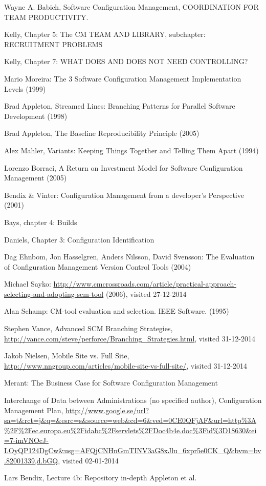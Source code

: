 \documentclass[10pt]{article}
\begin{document}
\begin{thebibliography}{1}

 Wayne A. Babich, Software Configuration Management, COORDINATION FOR TEAM PRODUCTIVITY.

 Kelly, Chapter 5: The CM TEAM AND LIBRARY, subchapter: RECRUITMENT PROBLEMS 

 Kelly, Chapter 7: WHAT DOES AND DOES NOT NEED CONTROLLING? 

 Mario Moreira: The 3 Software Configuration Management Implementation Levels (1999)

 Brad Appleton, Streamed Lines: Branching Patterns for Parallel Software Development (1998)

 Brad Appleton, The Baseline Reproducibility Principle (2005)

 Alex Mahler, Variants: Keeping Things Together and Telling Them Apart (1994)

 Lorenzo Borraci, A Return on Investment Model for Software Configuration Management (2005)

 Bendix \& Vinter: Configuration Management from a developer's Perspective (2001)

 Bays, chapter 4: Builds

 Daniels, Chapter 3: Configuration Identification

 Dag Ehnbom, Jon Hasselgren, Anders Nilsson, David Svensson: The Evaluation of Configuration Management Version Control Tools (2004)

 Michael Sayko: \url{http://www.cmcrossroads.com/article/practical-approach-selecting-and-adopting-scm-tool} (2006), visited 27-12-2014

 Alan Schamp: CM-tool evaluation and selection. IEEE Software. (1995)

 Stephen Vance, Advanced SCM Branching Strategies, \url{http://vance.com/steve/perforce/Branching_Strategies.html}, visited 31-12-2014

 Jakob Nielsen, Mobile Site vs. Full Site, \url{http://www.nngroup.com/articles/mobile-site-vs-full-site/}, visited 31-12-2014

 Merant: The Business Case for Software Configuration Management

 Interchange of Data between Administrations (no specified author), Configuration Management Plan, \url{http://www.google.se/url?sa=t&rct=j&q=&esrc=s&source=web&cd=6&ved=0CE0QFjAF&url=http\%3A\%2F\%2Fec.europa.eu\%2Fidabc\%2Fservlets\%2FDoc4b4e.doc\%3Fid\%3D18630&ei=7-imVNOcJ-LOyQP124DgCw&usg=AFQjCNHnGmTINV3aG8xJlu_6xpr5e0CK_Q&bvm=bv.82001339,d.bGQ}, visited 02-01-2014 

 Lars Bendix, Lecture 4b: Repository in-depth Appleton et al.
\end{thebibliography}
\end{document}
